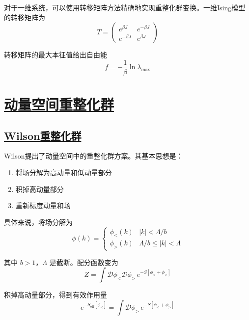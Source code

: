 对于一维系统，可以使用转移矩阵方法精确地实现重整化群变换。一维Ising模型的转移矩阵为
\begin{equation}
    T = \begin{pmatrix}
        e^{\beta J} & e^{-\beta J} \\
        e^{-\beta J} & e^{\beta J}
    \end{pmatrix}
\end{equation}

转移矩阵的最大本征值给出自由能
\begin{equation}
    f = -\frac{1}{\beta}\ln\lambda_{\max}
\end{equation}

\section{\protect\hyperlink{:}{动量空间重整化群}}

\subsection{\protect\hyperlink{:}{Wilson重整化群}}

Wilson提出了动量空间中的重整化群方案。其基本思想是：
\begin{enumerate}
    \item 将场分解为高动量和低动量部分
    \item 积掉高动量部分
    \item 重新标度动量和场
\end{enumerate}

具体来说，将场分解为
\begin{equation}
    \phi(k) = \begin{cases}
        \phi_<(k) & |k| < \Lambda/b \\
        \phi_>(k) & \Lambda/b \leq |k| < \Lambda
    \end{cases}
\end{equation}

其中 $b > 1$，$\Lambda$ 是截断。配分函数变为
\begin{equation}
    Z = \int \mathcal{D}\phi_< \mathcal{D}\phi_> \, e^{-S[\phi_< + \phi_>]}
\end{equation}

积掉高动量部分，得到有效作用量
\begin{equation}
    e^{-S_{\text{eff}}[\phi_<]} = \int \mathcal{D}\phi_> \, e^{-S[\phi_< + \phi_>]}
\end{equation}

